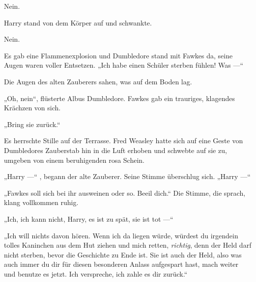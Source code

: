 Nein.

Harry stand von dem Körper auf und schwankte.

Nein.

Es gab eine Flammenexplosion und Dumbledore stand mit Fawkes da, seine Augen waren voller Entsetzen.
„Ich habe einen Schüler sterben fühlen! Was —“

Die Augen des alten Zauberers sahen, was auf dem Boden lag.

„Oh, nein“, flüsterte Albus Dumbledore. Fawkes gab ein trauriges, klagendes Krächzen von sich.

„Bring sie zurück.“

Es herrschte Stille auf der Terrasse. Fred Weasley hatte sich auf eine Geste von Dumbledores Zauberstab hin in die Luft erhoben und schwebte auf sie zu, umgeben von einem beruhigenden rosa Schein.

„Harry —“ , begann der alte Zauberer. Seine Stimme überschlug sich.
„Harry —“

„Fawkes soll sich bei ihr ausweinen oder so. Beeil dich.“ Die Stimme, die sprach, klang vollkommen ruhig.

„Ich, ich kann nicht, Harry, es ist zu spät, sie ist tot —“

„Ich will nichts davon hören. Wenn ich da liegen würde, würdest du irgendein tolles Kaninchen aus dem Hut ziehen und mich retten, \emph{richtig}, denn der Held darf nicht sterben, bevor die Geschichte zu Ende ist. Sie ist auch der Held, also was auch immer du dir für diesen besonderen Anlass aufgespart hast, mach weiter und benutze es jetzt. Ich verspreche, ich zahle es dir zurück.“

